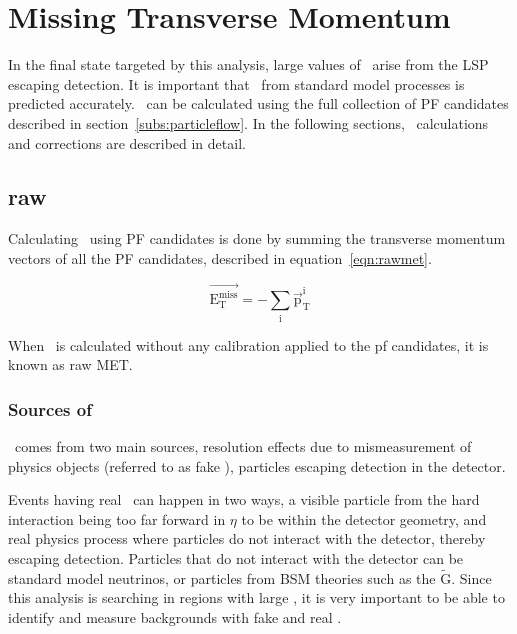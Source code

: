 \chapter{Missing Transverse Momentum}
\label{ch:MET}
In the final state targeted by this analysis, large values of \MET\ arise from the LSP escaping detection.
It is important that \MET\ from standard model processes is predicted accurately.
\MET\ can be calculated using the full collection of PF candidates described in section~\ref{subs:particleflow}.
In the following sections, \MET\ calculations and corrections are described in detail.

\section{raw \texorpdfstring{\MET}{MET}}

Calculating \MET\ using PF candidates is done by summing the transverse momentum vectors of all the PF candidates, described in equation~\ref{eqn:rawmet}.

\begin{equation}
  \label{eqn:rawmet}
\mathrm{\overrightarrow{E_{T}^{miss}} = -\sum_{i}\overrightarrow{p}_{T}^{i}}
\end{equation}

When \MET\ is calculated without any calibration applied to the pf candidates, it is known as raw MET.

\subsection{Sources of \texorpdfstring{\MET}{MET}}
\label{sec:metsources}
\MET\ comes from two main sources,
resolution effects due to mismeasurement of physics objects (referred to as fake \MET),
particles escaping detection in the detector.


Events having real \MET\ can happen in two ways,
a visible particle from the hard interaction being too far forward in $\eta$ to be within the detector geometry,
and real physics process where particles do not interact with the detector, thereby escaping detection.
Particles that do not interact with the detector can be standard model neutrinos, or particles from BSM theories such as the $\mathrm{\tilde{G}}$.
Since this analysis is searching in regions with large \MET, it is very important to be able to identify and measure backgrounds with fake \MET and real \MET.

